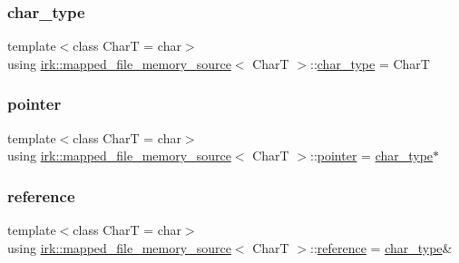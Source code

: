 \subsubsection{\texorpdfstring{char\+\_\+type}{char\_type}}
{\footnotesize\ttfamily template$<$class CharT  = char$>$ \\
using \mbox{\hyperlink{classirk_1_1mapped__file__memory__source}{irk\+::mapped\+\_\+file\+\_\+memory\+\_\+source}}$<$ CharT $>$\+::\mbox{\hyperlink{classirk_1_1mapped__file__memory__source_a9b4319787fae825c6a27be1e58447386}{char\+\_\+type}} =  CharT}

\mbox{\label{classirk_1_1mapped__file__memory__source_ada63505be1b6881458e74592a2a4f236}} 
\subsubsection{\texorpdfstring{pointer}{pointer}}
{\footnotesize\ttfamily template$<$class CharT  = char$>$ \\
using \mbox{\hyperlink{classirk_1_1mapped__file__memory__source}{irk\+::mapped\+\_\+file\+\_\+memory\+\_\+source}}$<$ CharT $>$\+::\mbox{\hyperlink{classirk_1_1mapped__file__memory__source_ada63505be1b6881458e74592a2a4f236}{pointer}} =  \mbox{\hyperlink{classirk_1_1mapped__file__memory__source_a9b4319787fae825c6a27be1e58447386}{char\+\_\+type}}$\ast$}

\mbox{\label{classirk_1_1mapped__file__memory__source_a4a2510b01a3bf4c3570617707b069bd6}} 
\subsubsection{\texorpdfstring{reference}{reference}}
{\footnotesize\ttfamily template$<$class CharT  = char$>$ \\
using \mbox{\hyperlink{classirk_1_1mapped__file__memory__source}{irk\+::mapped\+\_\+file\+\_\+memory\+\_\+source}}$<$ CharT $>$\+::\mbox{\hyperlink{classirk_1_1mapped__file__memory__source_a4a2510b01a3bf4c3570617707b069bd6}{reference}} =  \mbox{\hyperlink{classirk_1_1mapped__file__memory__source_a9b4319787fae825c6a27be1e58447386}{char\+\_\+type}}\&}



